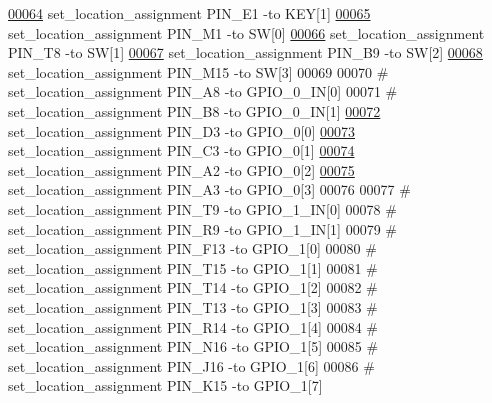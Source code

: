 \begin{DoxyCode}
\hypertarget{_d_e0___n_a_n_o___v_f_8qsf_source_l00064}{}\hyperlink{_d_e0___n_a_n_o___v_f_8qsf_a8601cf9c99edfa0e1b3cf42856d5e01c}{00064} set\_location\_assignment PIN\_E1 -to KEY[1]
\hypertarget{_d_e0___n_a_n_o___v_f_8qsf_source_l00065}{}\hyperlink{_d_e0___n_a_n_o___v_f_8qsf_a459e8a805e059235025c2bacf8479388}{00065} set\_location\_assignment PIN\_M1 -to SW[0]
\hypertarget{_d_e0___n_a_n_o___v_f_8qsf_source_l00066}{}\hyperlink{_d_e0___n_a_n_o___v_f_8qsf_add812efc19000eb892cef2fc9d454fe3}{00066} set\_location\_assignment PIN\_T8 -to SW[1]
\hypertarget{_d_e0___n_a_n_o___v_f_8qsf_source_l00067}{}\hyperlink{_d_e0___n_a_n_o___v_f_8qsf_acf6918a2839138e6f2da808c4a2184ed}{00067} set\_location\_assignment PIN\_B9 -to SW[2]
\hypertarget{_d_e0___n_a_n_o___v_f_8qsf_source_l00068}{}\hyperlink{_d_e0___n_a_n_o___v_f_8qsf_a6ecdb8849927d95288ff175f57e6f8c6}{00068} set\_location\_assignment PIN\_M15 -to SW[3]
00069 
00070 \textcolor{keyword}{# set\_location\_assignment PIN\_A8 -to GPIO\_0\_IN[0]}
00071 \textcolor{keyword}{# set\_location\_assignment PIN\_B8 -to GPIO\_0\_IN[1]}
\hypertarget{_d_e0___n_a_n_o___v_f_8qsf_source_l00072}{}\hyperlink{_d_e0___n_a_n_o___v_f_8qsf_a0e42bb8a9550206fc2615225287032b8}{00072} set\_location\_assignment PIN\_D3 -to GPIO\_0[0]
\hypertarget{_d_e0___n_a_n_o___v_f_8qsf_source_l00073}{}\hyperlink{_d_e0___n_a_n_o___v_f_8qsf_a7d3ad75d4fe6d3ced72f216f42a3dbd5}{00073} set\_location\_assignment PIN\_C3 -to GPIO\_0[1]
\hypertarget{_d_e0___n_a_n_o___v_f_8qsf_source_l00074}{}\hyperlink{_d_e0___n_a_n_o___v_f_8qsf_a16279866886eaaf567c8fdebb9c596b2}{00074} set\_location\_assignment PIN\_A2 -to GPIO\_0[2]
\hypertarget{_d_e0___n_a_n_o___v_f_8qsf_source_l00075}{}\hyperlink{_d_e0___n_a_n_o___v_f_8qsf_a74aab6f5e25e1c07425752485b2095b6}{00075} set\_location\_assignment PIN\_A3 -to GPIO\_0[3]
00076 
00077 \textcolor{keyword}{#  set\_location\_assignment PIN\_T9 -to GPIO\_1\_IN[0]}
00078 \textcolor{keyword}{# set\_location\_assignment PIN\_R9 -to GPIO\_1\_IN[1]}
00079 \textcolor{keyword}{# set\_location\_assignment PIN\_F13 -to GPIO\_1[0]}
00080 \textcolor{keyword}{# set\_location\_assignment PIN\_T15 -to GPIO\_1[1]}
00081 \textcolor{keyword}{# set\_location\_assignment PIN\_T14 -to GPIO\_1[2]}
00082 \textcolor{keyword}{# set\_location\_assignment PIN\_T13 -to GPIO\_1[3]}
00083 \textcolor{keyword}{# set\_location\_assignment PIN\_R14 -to GPIO\_1[4]}
00084 \textcolor{keyword}{# set\_location\_assignment PIN\_N16 -to GPIO\_1[5]}
00085 \textcolor{keyword}{# set\_location\_assignment PIN\_J16 -to GPIO\_1[6]}
00086 \textcolor{keyword}{# set\_location\_assignment PIN\_K15 -to GPIO\_1[7]}

\end{DoxyCode}
